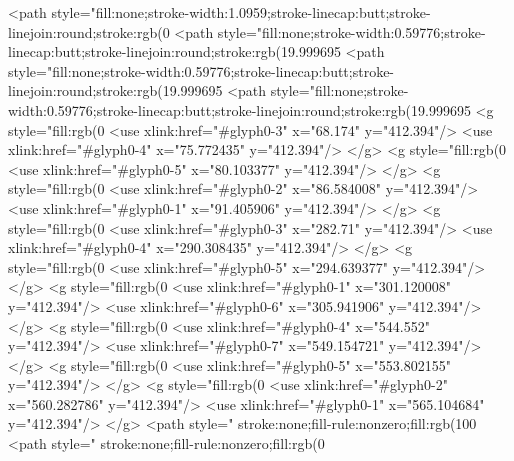 <path style="fill:none;stroke-width:1.0959;stroke-linecap:butt;stroke-linejoin:round;stroke:rgb(0%
<path style="fill:none;stroke-width:0.59776;stroke-linecap:butt;stroke-linejoin:round;stroke:rgb(19.999695%
<path style="fill:none;stroke-width:0.59776;stroke-linecap:butt;stroke-linejoin:round;stroke:rgb(19.999695%
<path style="fill:none;stroke-width:0.59776;stroke-linecap:butt;stroke-linejoin:round;stroke:rgb(19.999695%
<g style="fill:rgb(0%
  <use xlink:href="#glyph0-3" x="68.174" y="412.394"/>
  <use xlink:href="#glyph0-4" x="75.772435" y="412.394"/>
</g>
<g style="fill:rgb(0%
  <use xlink:href="#glyph0-5" x="80.103377" y="412.394"/>
</g>
<g style="fill:rgb(0%
  <use xlink:href="#glyph0-2" x="86.584008" y="412.394"/>
  <use xlink:href="#glyph0-1" x="91.405906" y="412.394"/>
</g>
<g style="fill:rgb(0%
  <use xlink:href="#glyph0-3" x="282.71" y="412.394"/>
  <use xlink:href="#glyph0-4" x="290.308435" y="412.394"/>
</g>
<g style="fill:rgb(0%
  <use xlink:href="#glyph0-5" x="294.639377" y="412.394"/>
</g>
<g style="fill:rgb(0%
  <use xlink:href="#glyph0-1" x="301.120008" y="412.394"/>
  <use xlink:href="#glyph0-6" x="305.941906" y="412.394"/>
</g>
<g style="fill:rgb(0%
  <use xlink:href="#glyph0-4" x="544.552" y="412.394"/>
  <use xlink:href="#glyph0-7" x="549.154721" y="412.394"/>
</g>
<g style="fill:rgb(0%
  <use xlink:href="#glyph0-5" x="553.802155" y="412.394"/>
</g>
<g style="fill:rgb(0%
  <use xlink:href="#glyph0-2" x="560.282786" y="412.394"/>
  <use xlink:href="#glyph0-1" x="565.104684" y="412.394"/>
</g>
<path style=" stroke:none;fill-rule:nonzero;fill:rgb(100%
<path style=" stroke:none;fill-rule:nonzero;fill:rgb(0%
